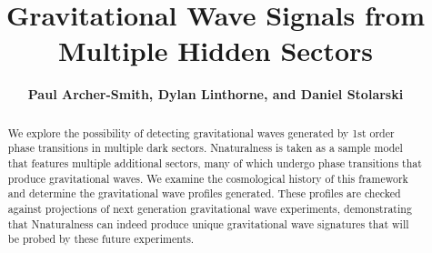 \documentclass[nofootinbib,twocolumn,preprintnumbers]{revtex4-1}
\begin{document}
\def\lsim{\mathrel{\rlap{\lower4pt\hbox{\hskip1pt$\sim$}}
  \raise1pt\hbox{$<$}}}
\def\gsim{\mathrel{\rlap{\lower4pt\hbox{\hskip1pt$\sim$}}
  \raise1pt\hbox{$>$}}}
\newcommand{\vev}[1]{ \left\langle {#1} \right\rangle }
\newcommand{\bra}[1]{ \langle {#1} | }
\newcommand{\ket}[1]{ | {#1} \rangle }
\newcommand{\ev}{ {\rm eV} }
\newcommand{\kev}{{\rm keV}}
\newcommand{\mev}{{\rm MeV}}
\newcommand{\gev}{{\mathrm GeV}}
\newcommand{\tev}{{\rm TeV}}
\newcommand{\mpl}{$M_{Pl}$}
\newcommand{\mw}{$M_{W}$}
\newcommand{\Ft}{F_{T}}
\newcommand{\Zparity}{\mathbb{Z}_2}
\newcommand{\BLambda}{\boldsymbol{\lambda}}
\newcommand{\met}{\;\not\!\!\!{E}_T}
\newcommand{\beq}{\begin{equation}}
\newcommand{\eeq}{\end{equation}}
\newcommand{\bea}{\begin{eqnarray}}
\newcommand{\eea}{\end{eqnarray}}
\newcommand{\nn}{\nonumber}
\newcommand{\hc}{\mathrm{h.c.}}
\newcommand{\eps}{\epsilon}
\newcommand{\bwt}{\begin{widetext}}
\newcommand{\ewt}{\end{widetext}}
\newcommand{\draftnote}[1]{{\bf\color{blue} #1}}

\newcommand{\cO}{{\cal O}}
\newcommand{\cL}{{\cal L}}
\newcommand{\cM}{{\cal M}}

\newcommand{\fref}[1]{Fig.~\ref{fig:#1}} 
\newcommand{\eref}[1]{Eq.~\eqref{eq:#1}} 
\newcommand{\aref}[1]{Appendix~\ref{app:#1}}
\newcommand{\sref}[1]{Section~\ref{sec:#1}}
\newcommand{\tref}[1]{Table~\ref{tab:#1}}

\title{\LARGE{{\bf{Gravitational Wave Signals from Multiple Hidden Sectors} \\
}}}
\author{{\bf {Paul Archer-Smith, Dylan Linthorne, and Daniel Stolarski}}}





\begin{abstract}
We explore the possibility of detecting gravitational waves generated by 1st order phase transitions in multiple dark sectors. Nnaturalness is taken as a sample model that features multiple additional sectors, many of which undergo phase transitions that produce gravitational waves. We examine the cosmological history of this framework and determine the gravitational wave profiles generated. These profiles are checked against projections of next generation gravitational wave experiments, demonstrating that Nnaturalness can indeed produce unique gravitational wave signatures that will be probed by these future experiments. 
\end{abstract}
\end{document}
